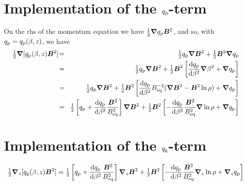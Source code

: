 \documentclass{article}
\title{}
\author{}
\date{\today,~ $ $Revision: 1.57 $ $}
\begin{document}
\maketitle

\section{Implementation of the $q_{\rm p}$-term}

On the rhs of the momentum equation we have ${\textstyle{1\over2}}{\bm{\nabla}}q_{\rm p}\bm{B}^2$, and so,
with $q_{\rm p}=q_{\rm p}(\beta,z)$, we have
\begin{eqnarray}
\half\nab[\qp(\beta,z)\BB^2]
\!&=&\!\half\qp\nab\BB^2+\half\BB^2\nab\qp\\
\!&=&\!\half\qp\nab\BB^2+\half\BB^2\left[{\dd\qp\over\dd\beta^2}\nab\beta^2+\nab\qp\right]
\\
\!&=&\!\half\qp\nab\BB^2+\half\BB^2\left[{\dd\qp\over\dd\beta^2}\Beq^{-2}(
\nab\BB^2-\BB^2\ln\rho)+\nab\qp\right]
\\
\!&=&\!\half\left[\qp+{\dd\qp\over\dd\beta^2}{\BB^2\over\Beq^2}\right]\nab\BB^2
+\half\BB^2\left[-{\dd\qp\over\dd\beta^2}{\BB^2\over\Beq^2}\nab\ln\rho+\nab\qp\right]
\end{eqnarray}

\section{Implementation of the $q_{\rm g}$-term}

\begin{eqnarray}
{\textstyle{1\over2}}{\bm{\nabla}}_z[q_{\rm g}(\beta,z)\bm{B}^2]
={\textstyle{1\over2}}\left[q_{\rm p}+{{\rm d} {}q_{\rm p}\over{\rm d} {}\beta^2}{\bm{B}^2\over B_{\rm eq}^2}\right]{\bm{\nabla}}_z\bm{B}^2
+{\textstyle{1\over2}}\bm{B}^2\left[-{{\rm d} {}q_{\rm p}\over{\rm d} {}\beta^2}{\bm{B}^2\over B_{\rm eq}^2}{\bm{\nabla}}_z\ln\rho+{\bm{\nabla}}_zq_{\rm p}\right]
\end{eqnarray}




\begin{verbatim}
\end{verbatim}
\end{document}
